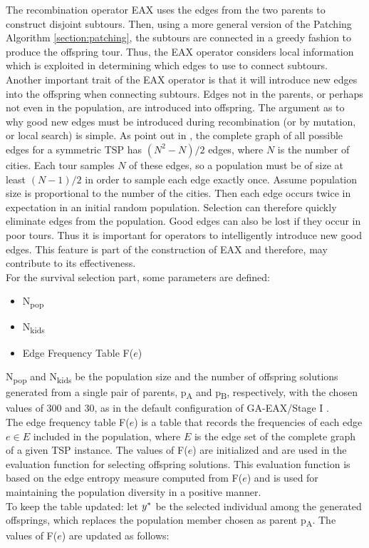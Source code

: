 
The recombination operator EAX uses the edges from the two parents to construct disjoint subtours.
Then, using a more general version of the Patching Algorithm \ref{section:patching}, the subtours are connected in a greedy fashion to produce the offspring tour. Thus, the EAX operator considers local information which is exploited in determining which edges to use to connect subtours.\\
Another important trait of the EAX operator is that it will introduce new edges into the offspring when connecting subtours. Edges not in the parents, or perhaps not even in the population, are introduced into offspring. 
The argument as to why good new edges must be introduced during recombination (or by mutation, or local search) is simple. As point out in \cite{Mathias92geneticoperators}, the complete graph of all possible edges for a symmetric TSP has $(N^2-N)/2$ edges, where $N$ is the number of cities. Each tour samples $N$ of these edges, so a population must be of size at least $(N-1)/2$ in order to sample each edge exactly once. Assume population size is proportional to the number of the cities. Then each edge occurs twice in expectation in an initial random population. Selection can therefore quickly eliminate edges from the population. Good edges can also be lost if they occur in poor tours. Thus it is important for operators to intelligently introduce new good edges. This feature is part of the construction of EAX and therefore, may contribute to its effectiveness.\\
For the survival selection part, some parameters are defined: 

\begin{itemize}
\item N\textsubscript{pop}
\item N\textsubscript{kids}
\item Edge Frequency Table F($e$)
\end{itemize}
N\textsubscript{pop} and N\textsubscript{kids} be the population size and the number of offspring solutions generated from a single pair of parents, p\textsubscript{A} and p\textsubscript{B}, respectively, with the chosen values of 300 and 30, as in the default configuration of GA-EAX/Stage I \cite{Nagata2013}. \\
The edge frequency table F($e$) is a table that records the frequencies of each edge $e \in E$ included in the population, where $E$ is the edge set of the complete graph of a given TSP instance. The values of F($e$) are initialized and are used in the evaluation function for selecting offspring solutions. This evaluation function is based on the edge entropy measure computed from F($e$) and is used for maintaining the population diversity in a positive manner. \\
To keep the table updated: let $y\ssymbol{1}$ be the selected individual among the generated offsprings, which replaces the population member chosen as parent p\textsubscript{A}. The values of F($e$) are updated as follows: 

